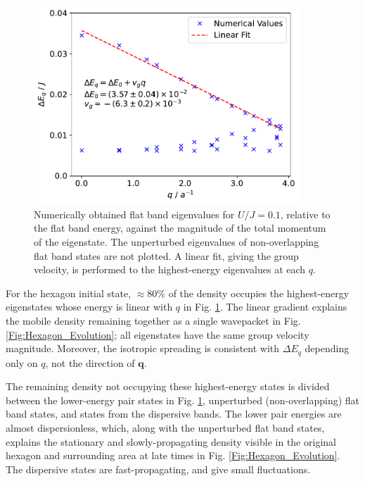 \vspace{0.5cm}

\begin{figure}[ht]
    \centering
    \includegraphics[width=10cm]{Figures/FB_Energy_Shifts}
    \caption{Numerically obtained flat band eigenvalues for $U/J=0.1$, relative to the flat band energy, against the magnitude of the total momentum of the eigenstate. The unperturbed eigenvalues of non-overlapping flat band states are not plotted. A linear fit, giving the group velocity, is performed to the highest-energy eigenvalues at each $q$.}
    \label{Fig:Energy_Shifts}
\end{figure}

For the hexagon initial state, $\approx 80\%$ of the density occupies the highest-energy eigenstates whose energy is linear with $q$ in Fig. \ref{Fig:Energy_Shifts}. The linear gradient explains the mobile density remaining together as a single wavepacket in Fig. \ref{Fig:Hexagon_Evolution}; all eigenstates have the same group velocity magnitude. Moreover, the isotropic spreading is consistent with $\Delta E_q$ depending only on $q$, not the direction of $\textbf{q}$. 

The remaining density not occupying these highest-energy states is divided between the lower-energy pair states in Fig. \ref{Fig:Energy_Shifts}, unperturbed (non-overlapping) flat band states, and states from the dispersive bands. The lower pair energies are almost dispersionless, which, along with the unperturbed flat band states, explains the stationary and slowly-propagating density visible in the original hexagon and surrounding area at late times in Fig. \ref{Fig:Hexagon_Evolution}. The dispersive states are fast-propagating, and give small fluctuations.

\vspace{1cm}

